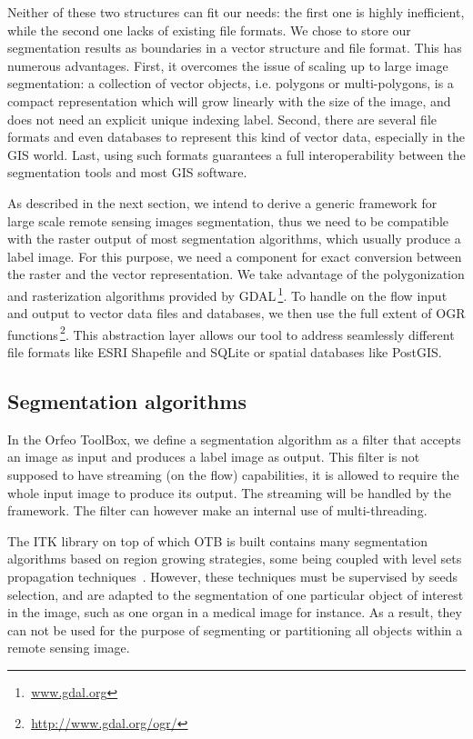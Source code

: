 \documentclass{josis}
\newcommand{\furl}[1]{$\,$\footnote{$\,$\url{#1}}}
\begin{document}
Neither of these two structures can fit our needs: the first one is
highly inefficient, while the second one lacks of existing file
formats. We chose to store our segmentation results as boundaries in a
vector structure and file format. This has numerous advantages. First,
it overcomes the issue of scaling up to large image segmentation: a
collection of vector objects, i.e. polygons or multi-polygons, is a
compact representation which will grow linearly with the size of the
image, and does not need an explicit unique indexing label. Second,
there are several file formats and even databases to represent this
kind of vector data, especially in the GIS world. Last, using such
formats guarantees a full interoperability between the segmentation
tools and most GIS software.

As described in the next section, we intend to derive a generic framework for
large scale remote sensing images segmentation, thus we need to be compatible
with the raster output of most segmentation algorithms, which usually produce a
label image. For this purpose, we need a component for exact conversion between
the raster and the vector representation. We take advantage of the
polygonization and rasterization algorithms provided by
GDAL\furl{www.gdal.org}. To handle on the flow input and output to vector data
files and databases, we then use the full extent of OGR
functions\furl{http://www.gdal.org/ogr/}. This abstraction layer allows our tool
to address seamlessly different file formats like ESRI Shapefile and SQLite or spatial
databases like PostGIS.

\subsection{Segmentation algorithms}
In the Orfeo ToolBox, we define a segmentation algorithm as a filter
that accepts an image as input and produces a label
image as output. This filter is not supposed to have streaming (on the
flow) capabilities, it is allowed to require the whole input image to
produce its output. The streaming will be handled by the
framework. The filter can however make an internal use of
multi-threading.

The ITK library on top of which OTB is built contains many
segmentation algorithms based on region growing strategies, some being
coupled with level sets propagation
techniques~\cite{otbSoftwareGuide}. However, these techniques must be
supervised by seeds selection, and are adapted to the segmentation of
one particular object of interest in the image, such as one organ in a
medical image for instance. As a result, they can not be used for the
purpose of segmenting or partitioning all objects within a remote
sensing image.
\end{document}
